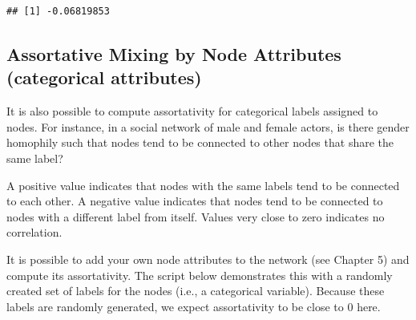 \documentclass[
]{book}
\newenvironment{Shaded}{\begin{snugshade}}{\end{snugshade}}
\newcommand{\AttributeTok}[1]{\textcolor[rgb]{0.13,0.29,0.53}{#1}}
\newcommand{\CommentTok}[1]{\textcolor[rgb]{0.56,0.35,0.01}{\textit{#1}}}
\newcommand{\DecValTok}[1]{\textcolor[rgb]{0.00,0.00,0.81}{#1}}
\newcommand{\FunctionTok}[1]{\textcolor[rgb]{0.13,0.29,0.53}{\textbf{#1}}}
\newcommand{\NormalTok}[1]{#1}
\newcommand{\OtherTok}[1]{\textcolor[rgb]{0.56,0.35,0.01}{#1}}
\newcommand{\SpecialCharTok}[1]{\textcolor[rgb]{0.81,0.36,0.00}{\textbf{#1}}}
\newcommand{\StringTok}[1]{\textcolor[rgb]{0.31,0.60,0.02}{#1}}
\begin{document}
\begin{verbatim}
## [1] -0.06819853
\end{verbatim}

\subsection{Assortative Mixing by Node Attributes (categorical attributes)}\label{assortative-mixing-by-node-attributes-categorical-attributes}

It is also possible to compute assortativity for categorical labels assigned to nodes. For instance, in a social network of male and female actors, is there gender homophily such that nodes tend to be connected to other nodes that share the same label?

A positive value indicates that nodes with the same labels tend to be connected to each other. A negative value indicates that nodes tend to be connected to nodes with a different label from itself. Values very close to zero indicates no correlation.

It is possible to add your own node attributes to the network (see Chapter 5) and compute its assortativity. The script below demonstrates this with a randomly created set of labels for the nodes (i.e., a categorical variable). Because these labels are randomly generated, we expect assortativity to be close to 0 here.

\begin{Shaded}
\end{Shaded}
\end{document}
